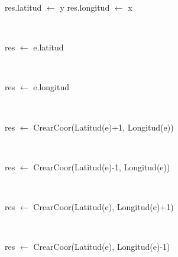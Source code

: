 \begin{Algoritmos}

	\begin{algorithm}[H]
		\NoCaptionOfAlgo
		\caption{}
		res.latitud $\leftarrow$ y
		res.longitud $\leftarrow$ x
	\end{algorithm}

	~

	\begin{algorithm}[H]
		\NoCaptionOfAlgo
		\caption{}
		res $\leftarrow$ e.latitud
	\end{algorithm}

	~

	\begin{algorithm}[H]
		\NoCaptionOfAlgo
		\caption{}
		res $\leftarrow$ e.longitud
	\end{algorithm}

	~

	\begin{algorithm}[H]
		\NoCaptionOfAlgo
		\caption{}
		res $\leftarrow$ CrearCoor(Latitud(e)+1, Longitud(e))
	\end{algorithm}

	~

	\begin{algorithm}[H]
		\NoCaptionOfAlgo
		\caption{}
		res $\leftarrow$ CrearCoor(Latitud(e)-1, Longitud(e))
	\end{algorithm}

	~

	\begin{algorithm}[H]
		\NoCaptionOfAlgo
		\caption{}
		res $\leftarrow$ CrearCoor(Latitud(e), Longitud(e)+1)
	\end{algorithm}

	~

	\begin{algorithm}[H]
		\NoCaptionOfAlgo
		\caption{}
		res $\leftarrow$ CrearCoor(Latitud(e), Longitud(e)-1)
	\end{algorithm}

	~


\end{Algoritmos}
